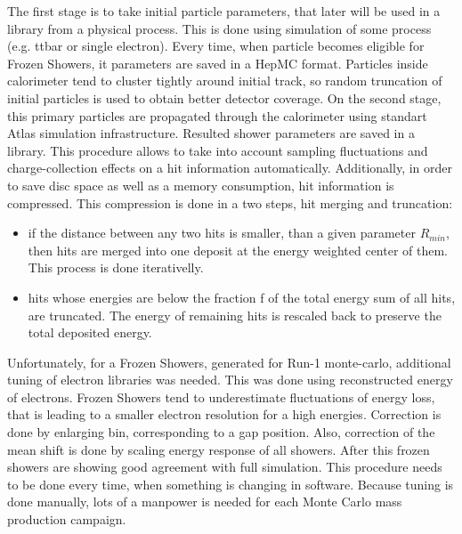 The first stage is to take initial particle parameters, that later will be used in a library from a physical process. This is done using simulation of some process (e.g. ttbar or single electron). Every time, when particle becomes eligible for Frozen Showers, it parameters are saved in a HepMC format. Particles inside calorimeter tend to cluster tightly around initial track, so random truncation of initial particles is used to obtain better detector coverage. On the second stage, this primary particles are propagated through the calorimeter using standart Atlas simulation infrastructure. Resulted shower parameters are saved in a library. This procedure allows to take into account sampling fluctuations and charge-collection effects on a hit information automatically. Additionally, in order to save disc space as well as a memory consumption, hit information is compressed. This compression is done in a two steps, hit merging and truncation:
\begin{itemize}
\item if the distance between any two hits is smaller, than a given parameter $R_{min}$, then hits are merged into one deposit at the energy weighted center of them. This process is done iterativelly.
\item hits whose energies are below the fraction f of the total energy sum of all hits, are truncated. The energy of remaining hits is rescaled back to preserve the total deposited energy.
\end{itemize}

Unfortunately, for a Frozen Showers, generated for Run-1 monte-carlo, additional tuning of electron libraries was needed. This was done using reconstructed energy of electrons. Frozen Showers tend to underestimate fluctuations of energy loss, that is leading to a smaller electron resolution for a high energies. Correction is done by enlarging bin, corresponding to a gap position. Also, correction of the mean shift is done by scaling energy response of all showers. After this frozen showers are showing good agreement with full simulation. This procedure needs to be done every time, when something is changing in software. Because tuning is done manually, lots of a manpower is needed for each Monte Carlo mass production campaign.



\begin{figure}[h]
\end{figure}

